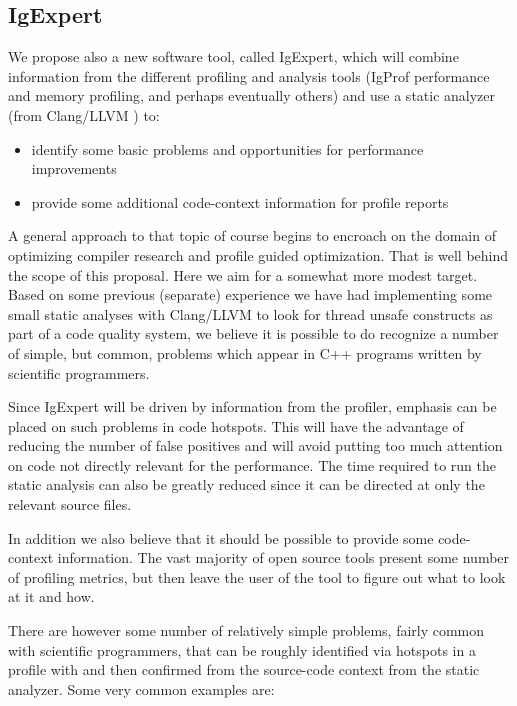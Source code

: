 \documentclass[notitlepage,letter,12pt]{article}
\begin{document}
\subsection{IgExpert}

  We propose also a new software tool, called IgExpert, which will combine 
information from the different profiling and analysis tools (IgProf performance
and memory profiling, and perhaps eventually others) and use a static
analyzer (from Clang/LLVM \cite{CLANGLLVMSTAT}) to:

\begin{itemize}
\item identify some basic problems and opportunities for performance improvements 
\item provide some additional code-context information for profile reports 
\end{itemize}

A general approach to that topic of course begins to encroach on the domain of
optimizing compiler research and profile guided optimization. That is well
behind the scope of this proposal. Here we aim for a somewhat more modest
target. Based on some previous (separate) experience we have had implementing
some small static analyses with Clang/LLVM to look for thread unsafe
constructs as part of a code quality system, we believe it is
possible to do recognize a number of simple, but common, problems which 
appear in C++ programs written by scientific programmers. 

Since IgExpert will be driven by information from the profiler, emphasis
can be placed on such problems in code hotspots. This will have the
advantage of reducing the number of false positives and will avoid
putting too much attention on code not directly relevant for the performance.
The time required to run the static analysis can also be greatly
reduced since it can be directed at only the relevant source files.

  In addition we also believe that it should be possible to provide
some code-context information. The vast majority of open source tools
present some number of profiling metrics, but then leave the user of the tool
to figure out what to look at it and how.

There are however some number of relatively simple problems, fairly common 
with scientific programmers, that can be roughly identified via 
hotspots in a profile with and then confirmed from the source-code context 
from the static analyzer. Some very common examples are:
\end{document}
